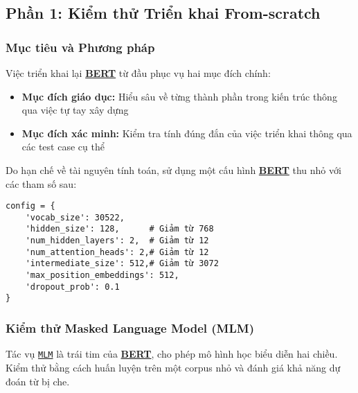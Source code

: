 \subsection{Phần 1: Kiểm thử Triển khai From-scratch}
\label{ssec:kiem_thu_from_scratch}

\subsubsection{Mục tiêu và Phương pháp}

Việc triển khai lại \hyperref[acro:bert]{\textbf{BERT}} từ đầu phục vụ hai mục đích chính:
\begin{itemize}
    \item \textbf{Mục đích giáo dục:} Hiểu sâu về từng thành phần trong kiến trúc thông qua việc tự tay xây dựng
    \item \textbf{Mục đích xác minh:} Kiểm tra tính đúng đắn của việc triển khai thông qua các test case cụ thể
\end{itemize}

Do hạn chế về tài nguyên tính toán,  sử dụng một cấu hình \hyperref[acro:bert]{\textbf{BERT}} thu nhỏ với các tham số sau:

\begin{verbatim}
config = {
    'vocab_size': 30522,
    'hidden_size': 128,      # Giảm từ 768
    'num_hidden_layers': 2,  # Giảm từ 12
    'num_attention_heads': 2,# Giảm từ 12
    'intermediate_size': 512,# Giảm từ 3072
    'max_position_embeddings': 512,
    'dropout_prob': 0.1
}
\end{verbatim}

\subsubsection{Kiểm thử Masked Language Model (MLM)}

Tác vụ \hyperref[acro:mlm]{\texttt{MLM}} là trái tim của \hyperref[acro:bert]{\textbf{BERT}}, cho phép mô hình học biểu diễn hai chiều. Kiểm thử bằng cách huấn luyện trên một corpus nhỏ và đánh giá khả năng dự đoán từ bị che.

